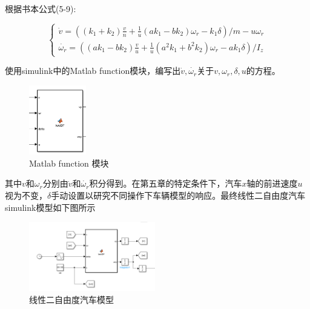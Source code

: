 根据书本公式(5-9):

$$
\begin{cases}
\dot{v} = ((k_1+k_2)\frac{v}{n}+\frac{1}{u}(ak_1-bk_2)\omega_r -k_1\delta)/m-u\omega_r \\
\dot{\omega_r}=((ak_1-bk_2)\frac{v}{u}+\frac{1}{u}(a^2k_1+b^2k_2)\omega_r-ak_1\delta)/I_z
\end{cases}
$$    

使用simulink中的Matlab function模块，编写出$\dot{v},\dot{\omega_r}$关于$v,\omega_r,\delta,u$的方程。

\begin{figure}[h]
    \centering
    \includegraphics[width=2.5cm]{figure/fcn.png}
    \caption{Matlab function 模块}
    \label{matlabfcn}
\end{figure}

其中$v$和$\omega_r$分别由$\dot{v}$和$\dot{\omega_r}$积分得到。在第五章的特定条件下，汽车$x$轴的前进速度$u$视为不变，$\delta$手动设置以研究不同操作下车辆模型的响应。最终线性二自由度汽车simulink模型如下图所示

\begin{figure}[h]
    \centering
    \includegraphics[width=5.5cm]{figure/2DF.png}
    \caption{线性二自由度汽车模型}
    \label{2DF}
\end{figure}

